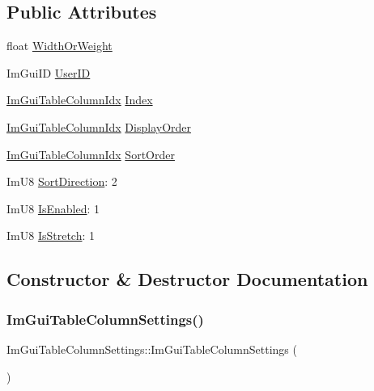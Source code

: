 \subsection*{Public Attributes}
\begin{DoxyCompactItemize}
\item 
float \hyperlink{structImGuiTableColumnSettings_aebe7c9f3741414220444af5bc9515244}{Width\+Or\+Weight}
\item 
Im\+Gui\+ID \hyperlink{structImGuiTableColumnSettings_a8b68ca3c4df704ce887e11e9b2a4ac8b}{User\+ID}
\item 
\hyperlink{imgui__internal_8h_abe1882c8292cd23a77a54eda2407f147}{Im\+Gui\+Table\+Column\+Idx} \hyperlink{structImGuiTableColumnSettings_aaead6c42b6af8f565fbc8c927f944cec}{Index}
\item 
\hyperlink{imgui__internal_8h_abe1882c8292cd23a77a54eda2407f147}{Im\+Gui\+Table\+Column\+Idx} \hyperlink{structImGuiTableColumnSettings_aabe71d9f937cfc3dc75c29510ee4c528}{Display\+Order}
\item 
\hyperlink{imgui__internal_8h_abe1882c8292cd23a77a54eda2407f147}{Im\+Gui\+Table\+Column\+Idx} \hyperlink{structImGuiTableColumnSettings_a02bbac8295bbbdc8e5d7b53925340c9e}{Sort\+Order}
\item 
Im\+U8 \hyperlink{structImGuiTableColumnSettings_ac080684798a74d8c0a52e5ee383f5f4c}{Sort\+Direction}\+: 2
\item 
Im\+U8 \hyperlink{structImGuiTableColumnSettings_a0da1644ba45d3b5df029afa27568b8af}{Is\+Enabled}\+: 1
\item 
Im\+U8 \hyperlink{structImGuiTableColumnSettings_aba294c8530cde8eaaafc15423c5ad45b}{Is\+Stretch}\+: 1
\end{DoxyCompactItemize}


\subsection{Constructor \& Destructor Documentation}
\mbox{\label{structImGuiTableColumnSettings_ac45c9010562d52674cce08cf2cc41568}} 
\subsubsection{\texorpdfstring{Im\+Gui\+Table\+Column\+Settings()}{ImGuiTableColumnSettings()}}
{\footnotesize\ttfamily Im\+Gui\+Table\+Column\+Settings\+::\+Im\+Gui\+Table\+Column\+Settings (\begin{DoxyParamCaption}{ }\end{DoxyParamCaption})\hspace{0.3cm}{\ttfamily [inline]}}



